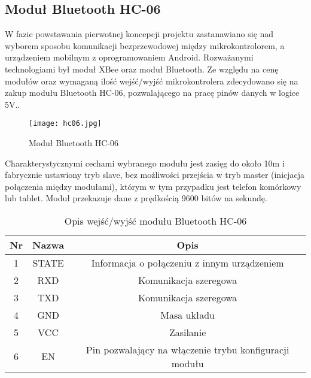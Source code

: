 \subsection{Moduł Bluetooth HC-06}%

W fazie powstawania pierwotnej koncepcji projektu zastanawiano się nad wyborem sposobu komunikacji bezprzewodowej między mikrokontrolorem, a urządzeniem mobilnym z oprogramowaniem Android. Rozważanymi technologiami był moduł XBee oraz moduł Bluetooth. Ze względu na cenę modułów oraz wymaganą ilość wejść/wyjść mikrokontrolera zdecydowano się na zakup modułu Bluetooth HC-06, pozwalającego na pracę pinów danych w logice 5V..
\begin{figure}[H]
	\centering
	\texttt{[image: hc06.jpg]}
	\caption{Moduł Bluetooth HC-06}
\end{figure}
Charakterystycznymi cechami wybranego modułu jest zasięg do około 10m i fabrycznie ustawiony tryb slave, bez możliwości przejścia w tryb master (inicjacja połączenia między modułami), którym w tym przypadku jest telefon komórkowy lub tablet. Moduł przekazuje dane z prędkością 9600 bitów na sekundę.

\begin{table}[H]
	\centering
	\caption{Opis wejść/wyjść modułu Bluetooth HC-06}
	\begin{tabular}{|c|c|c|}
		
  \hline 
 \bfseries Nr & \bfseries Nazwa & \bfseries Opis \\
  \hline
  1&STATE& Informacja o połączeniu z innym urządzeniem  \\
  \hline
  2&RXD& Komunikacja szeregowa  \\
  \hline
  3&TXD& Komunikacja szeregowa \\
  \hline
  4&GND& Masa układu \\
  \hline
    5&VCC& Zasilanie  \\
  \hline
      6&EN&Pin pozwalający na włączenie trybu konfiguracji modułu \\
  \hline
\end{tabular}
\end{table}
